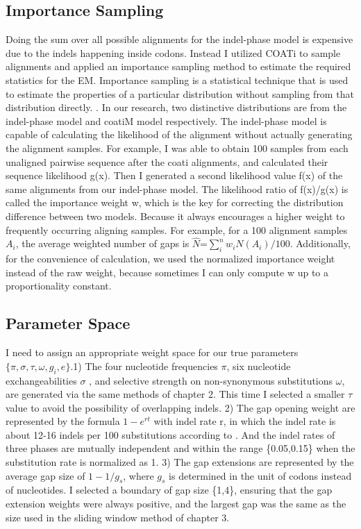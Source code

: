 \subsection{Importance Sampling}
Doing the sum over all possible alignments for the indel-phase model is expensive due to the indels happening inside codons. Instead I utilized COATi to sample alignments and applied an importance sampling method to estimate the required statistics for the EM. Importance sampling is a statistical technique that is used to estimate the properties of a particular distribution without sampling from that distribution directly. \parencite{kloek1978bayesian}. In our research, two distinctive distributions are from the indel-phase model and coatiM model respectively. The indel-phase model is capable of calculating the likelihood of the alignment without actually generating the alignment samples. For example, I was able to obtain 100 samples from each unaligned pairwise sequence after the coati alignments, and calculated their sequence likelihood g(x). Then I generated a second likelihood value f(x) of the same alignments from our indel-phase model. The likelihood ratio of f(x)/g(x) is called the importance weight w, which is the key for correcting the distribution difference between two models. Because it always encourages a higher weight to frequently occurring aligning samples. For example, for a 100 alignment samples $A_i$, the average weighted number of gaps  is $\hat N$=$\sum_{i}^n w_i N(A_i) /100$. Additionally, for the convenience of calculation, we used the normalized importance weight instead of the raw weight, because sometimes I can only compute w up to a proportionality constant. 

\subsection{Parameter Space}
I need to assign an appropriate weight space for our true parameters $\{\pi, \sigma, \tau, \omega, g_i, e\}$.1) The four nucleotide frequencies $\pi$, six nucleotide exchangeabilities $\sigma$ , and selective strength on non-synonymous substitutions $\omega$, are generated via the same methods of chapter 2. This time I selected a smaller $\tau$ value to avoid the possibility of overlapping indels. 2) The gap opening weight are represented by the formula $1-e^{r t}$ with indel rate r, in which the indel rate is about 12-16 indels per 100 substitutions according to \citeauthor{cartwright2009problems}. And the indel rates of three phases are mutually independent and within the range \{0.05,0.15\} when the substitution rate is normalized as 1. 3) The gap extensions are represented by the average gap size of $1-1/g_s$, where $g_s$ is determined in the unit of codons instead of nucleotides. I selected a boundary of gap size \{1,4\}, ensuring that the gap extension weights were always positive, and the largest gap was the same as the size used in the sliding window method of chapter 3.  

